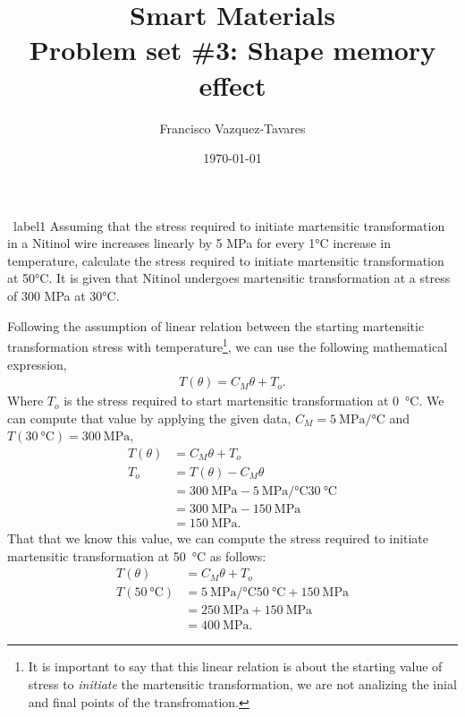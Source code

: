 \documentclass[a4paper]{tufte-handout} %
\title{Smart Materials\\ Problem set \#3: Shape memory effect}
\author{Francisco Vazquez-Tavares}
\date{\today} %
\begin{document}
\maketitle %
\justifying


\begin{prob}{~}{label1}
Assuming that the stress required to initiate martensitic transformation in a Nitinol wire increases linearly by 5 MPa for every 1°C increase in temperature, calculate the stress required to initiate martensitic transformation at 50°C. 
It is given that Nitinol undergoes martensitic transformation at a stress of 300 MPa at 30°C.
\end{prob}

Following the assumption of linear relation between the starting martensitic transformation stress with temperature\footnote{It is important to say that this linear relation is about the starting value of stress to \textit{initiate} the martensitic transformation, we are not analizing the inial and final points of the transfromation.}, we can use the following mathematical expression,
\begin{gather*}
    T(\theta) = C_{M}\theta + T_o.
\end{gather*}
Where $T_o$ is the stress required to start martensitic transformation at \SI{0}{\degreeCelsius}.
We can compute that value by applying the given data, $C_{M}=\SI{5}{\mega\pascal\per\degreeCelsius}$ and $T(\SI{30}{\degreeCelsius})=\SI{300}{\mega\pascal}$,
\begin{align*}
    T(\theta) &= C_{M}\theta + T_o \\
    T_o &= T(\theta) - C_{M}\theta \\
        &= \SI{300}{\mega\pascal} - \SI{5}{\mega\pascal\per\degreeCelsius}\SI{30}{\degreeCelsius} \\
        &= \SI{300}{\mega\pascal} - \SI{150}{\mega\pascal} \\
        &= \SI{150}{\mega\pascal}.
\end{align*}
That that we know this value, we can compute the stress required to initiate martensitic transformation at \SI{50}{\degreeCelsius} as follows:
\begin{align*}
    T(\theta) &= C_{M}\theta + T_o \\
    T(\SI{50}{\degreeCelsius}) &= \SI{5}{\mega\pascal\per\degreeCelsius}\SI{50}{\degreeCelsius} + \SI{150}{\mega\pascal} \\
                               &= \SI{250}{\mega\pascal} + \SI{150}{\mega\pascal} \\
                               &= \SI{400}{\mega\pascal}.
\end{align*}
\end{document}
